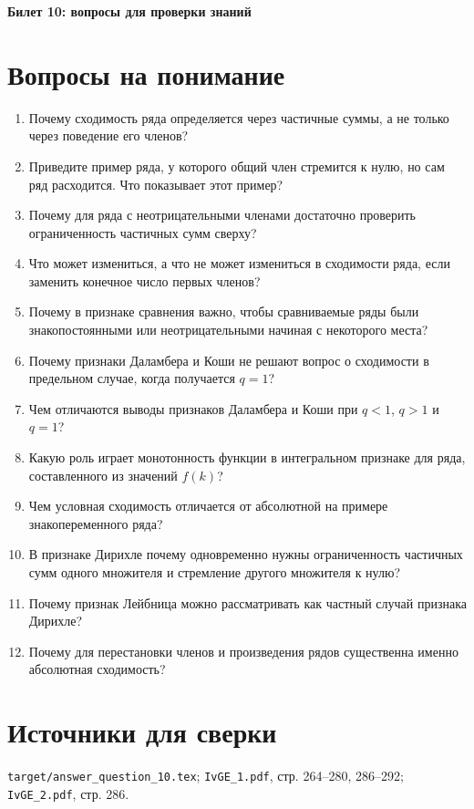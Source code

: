 \documentclass[12pt,a4paper]{article}
\begin{document}
\begin{center}
{\Large\bfseries Билет 10: вопросы для проверки знаний}
\end{center}

\noindent{}

\section*{Вопросы на понимание}

\begin{enumerate}
\item Почему сходимость ряда определяется через частичные суммы, а не только через поведение его членов?
\item Приведите пример ряда, у которого общий член стремится к нулю, но сам ряд расходится. Что показывает этот пример?
\item Почему для ряда с неотрицательными членами достаточно проверить ограниченность частичных сумм сверху?
\item Что может измениться, а что не может измениться в сходимости ряда, если заменить конечное число первых членов?
\item Почему в признаке сравнения важно, чтобы сравниваемые ряды были знакопостоянными или неотрицательными начиная с некоторого места?
\item Почему признаки Даламбера и Коши не решают вопрос о сходимости в предельном случае, когда получается \(q=1\)?
\item Чем отличаются выводы признаков Даламбера и Коши при \(q<1\), \(q>1\) и \(q=1\)?
\item Какую роль играет монотонность функции в интегральном признаке для ряда, составленного из значений \(f(k)\)?
\item Чем условная сходимость отличается от абсолютной на примере знакопеременного ряда?
\item В признаке Дирихле почему одновременно нужны ограниченность частичных сумм одного множителя и стремление другого множителя к нулю?
\item Почему признак Лейбница можно рассматривать как частный случай признака Дирихле?
\item Почему для перестановки членов и произведения рядов существенна именно абсолютная сходимость?
\end{enumerate}

\section*{Источники для сверки}

\texttt{target/answer\_question\_10.tex};
\texttt{IvGE\_1.pdf}, стр. 264--280, 286--292;
\texttt{IvGE\_2.pdf}, стр. 286.
\end{document}
